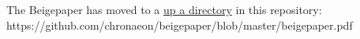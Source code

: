 \documentclass[]{article}
\title{}
\author{}
\date{}
\begin{document}
\maketitle

The Beigepaper has moved to a \href{https://github.com/chronaeon/beigepaper/blob/master/beigepaper.pdf}{up a directory} in this repository: \\ https://github.com/chronaeon/beigepaper/blob/master/beigepaper.pdf 
\end{document}
